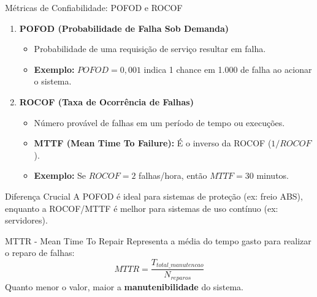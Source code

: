 \documentclass[9pt]{beamer}
\begin{document}
\begin{frame}{Métricas de Confiabilidade: POFOD e ROCOF}
    \begin{enumerate}
        \item \textbf{POFOD (Probabilidade de Falha Sob Demanda)}
        \begin{itemize}
            \item Probabilidade de uma requisição de serviço resultar em falha.
            \item \textbf{Exemplo:} $POFOD = 0,001$ indica 1 chance em 1.000 de falha ao acionar o sistema.
        \end{itemize}

        \vspace{0.3cm}
        \item \textbf{ROCOF (Taxa de Ocorrência de Falhas)}
        \begin{itemize}
            \item Número provável de falhas em um período de tempo ou execuções.
            \item \textbf{MTTF (Mean Time To Failure):} É o inverso da ROCOF ($1/ROCOF$).
            \item \textbf{Exemplo:} Se $ROCOF = 2$ falhas/hora, então $MTTF = 30$ minutos.
        \end{itemize}
    \end{enumerate}

    \begin{block}{Diferença Crucial}
        \small
        A POFOD é ideal para sistemas de proteção (ex: freio ABS), enquanto a ROCOF/MTTF é melhor para sistemas de uso contínuo (ex: servidores).
    \end{block}
    \begin{block}{MTTR - Mean Time To Repair}
    Representa a média do tempo gasto para realizar o reparo de falhas:
    \[ MTTR = \frac{T_{total\_manutencao}}{N_{reparos}} \]
    Quanto menor o valor, maior a \textbf{manutenibilidade} do sistema.
\end{block}
\end{frame}
\end{document}
